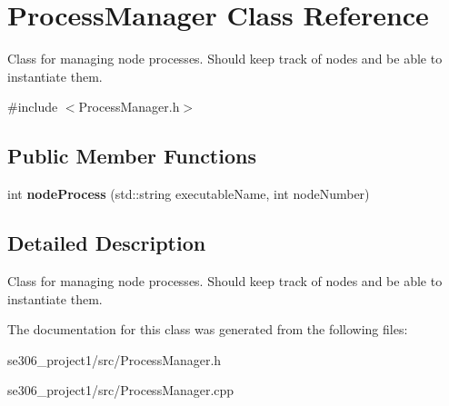 \hypertarget{classProcessManager}{\section{Process\-Manager Class Reference}
\label{classProcessManager}
}


Class for managing node processes. Should keep track of nodes and be able to instantiate them.  




{\ttfamily \#include $<$Process\-Manager.\-h$>$}

\subsection*{Public Member Functions}
\begin{DoxyCompactItemize}
\item 
\hypertarget{classProcessManager_ac551563da6cc98d4639a6724372815ef}{int {\bfseries node\-Process} (std\-::string executable\-Name, int node\-Number)}\label{classProcessManager_ac551563da6cc98d4639a6724372815ef}

\end{DoxyCompactItemize}


\subsection{Detailed Description}
Class for managing node processes. Should keep track of nodes and be able to instantiate them. 

The documentation for this class was generated from the following files\-:\begin{DoxyCompactItemize}
\item 
se306\-\_\-project1/src/Process\-Manager.\-h\item 
se306\-\_\-project1/src/Process\-Manager.\-cpp\end{DoxyCompactItemize}

